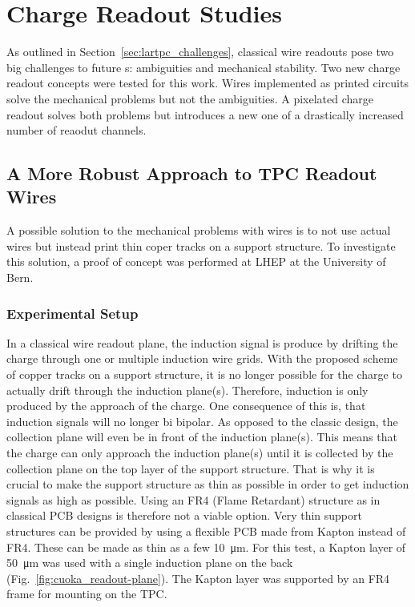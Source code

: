 \chapter{Charge Readout Studies}
\label{chap:charge-ro}

As outlined in Section~\ref{sec:lartpc_challenges}, classical wire readouts pose two big challenges to future \lartpc{}s: ambiguities and mechanical stability.
Two new charge readout concepts were tested for this work.
Wires implemented as printed circuits solve the mechanical problems but not the ambiguities.
A pixelated charge readout solves both problems but introduces a new one of a drastically increased number of reaodut channels.


\section{A More Robust Approach to TPC Readout Wires}
\label{sec:charge-ro_cuoka}

A possible solution to the mechanical problems with wires is to not use actual wires but instead print thin coper tracks on a support structure.
To investigate this solution, a proof of concept was performed at LHEP at the University of Bern.


\subsection*{Experimental Setup}

In a classical wire readout plane, the induction signal is produce by drifting the charge through one or multiple induction wire grids.
With the proposed scheme of copper tracks on a support structure, it is no longer possible for the charge to actually drift through the induction plane(s).
Therefore, induction is only produced by the approach of the charge.
One consequence of this is, that induction signals will no longer bi bipolar.
As opposed to the classic design, the collection plane will even be in front of the induction plane(s).
This means that the charge can only approach the induction plane(s) until it is collected by the collection plane on the top layer of the support structure.
That is why it is crucial to make the support structure as thin as possible in order to get induction signals as high as possible.
Using an FR4 (Flame Retardant) structure as in classical PCB designs is therefore not a viable option.
Very thin support structures can be provided by using a flexible PCB made from Kapton instead of FR4.
These can be made as thin as a few \SI{10}{\micro\metre}.
For this test, a Kapton layer of \SI{50}{\micro\metre} was used with a single induction plane on the back (Fig.~\ref{fig:cuoka_readout-plane}).
The Kapton layer was supported by an FR4 frame for mounting on the TPC.

